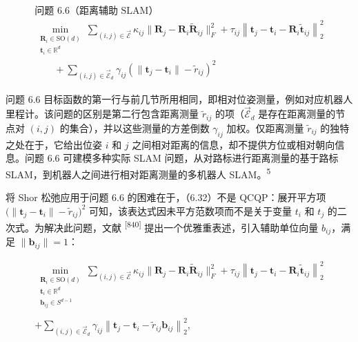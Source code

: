 \begin{equation}
\begin{array}{l} \text {问题 6.6（距离辅助 SLAM）} \\ \min_ {\substack {\boldsymbol {R} _ {i} \in \mathrm{SO} (d) \\ \boldsymbol {t} _ {i} \in \mathbb {R} ^ {d}}} \sum_ {(i, j) \in \overrightarrow {\mathcal {E}}} \kappa_ {i j} \| \boldsymbol {R} _ {j} - \boldsymbol {R} _ {i} \tilde {\boldsymbol {R}} _ {i j} \| _ {F} ^ {2} + \tau_ {i j} \left\| \boldsymbol {t} _ {j} - \boldsymbol {t} _ {i} - \boldsymbol {R} _ {i} \tilde {\boldsymbol {t}} _ {i j} \right\| _ {2} ^ {2} \\ \qquad + \sum_ {(i, j) \in \overrightarrow {\mathcal {E}} _ {d}} \gamma_ {i j} \left(\| \boldsymbol {t} _ {j} - \boldsymbol {t} _ {i} \| - \tilde {r} _ {i j}\right) ^ {2} \end{array}\tag{6.32}
\end{equation}

问题 6.6 目标函数的第一行与前几节所用相同，即相对位姿测量，例如对应机器人里程计。该问题的区别是第二行包含距离测量 $\tilde { r } _ { i j }$ 的项（$\overrightarrow { \mathcal { E } } _ { d }$ 是存在距离测量的节点对 $( i , j )$ 的集合），并以这些测量的方差倒数 $\gamma _ { i j }$ 加权。仅距离测量 $\tilde { r } _ { i j }$ 的独特之处在于，它给出位姿 $i$ 和 $j$ 之间相对距离的信息，却不提供方位或相对朝向信息。问题 6.6 可建模多种实际 SLAM 问题，从对路标进行距离测量的基于路标 SLAM，到机器人之间进行相对距离测量的多机器人 SLAM。\textsuperscript{5}

将 Shor 松弛应用于问题 6.6 的困难在于，（6.32）不是 QCQP：展开平方项 $\big ( \| \pmb { t } _ { j } - \pmb { t } _ { i } \| - \widetilde { r } _ { i j } \big ) ^ { 2}$ 可知，该表达式因未平方范数项而不是关于变量 $t_i$ 和 $t_j$ 的二次式。为解决此问题，文献 \textsuperscript{[840]} 提出一个优雅重表述，引入辅助单位向量 $b _ { i j }$，满足 $\| \pmb { b } _ { i j } \| = 1$：

\begin{equation}
\begin{array}{c}\min_{\substack{\boldsymbol{R}_{i}\in \mathrm{SO}(d)\\ \boldsymbol{t}_{i}\in \mathbb{R}^{d}\\ \boldsymbol{b}_{ij}\in S^{d - 1}}}\sum_{(i,j)\in \overrightarrow{\mathcal{E}}}\kappa_{ij}\| \boldsymbol{R}_{j} - \boldsymbol{R}_{i}\tilde{\boldsymbol{R}}_{ij}\|_{F}^{2} + \tau_{ij}\left\| \boldsymbol{t}_{j} - \boldsymbol{t}_{i} - \boldsymbol{R}_{i}\tilde{\boldsymbol{t}}_{ij}\right\|_{2}^{2}\\ \\ +\sum_{(i,j)\in \overrightarrow{\mathcal{E}}_{d}}\gamma_{ij}\left\| \boldsymbol{t}_{j} - \boldsymbol{t}_{i} - \tilde{r}_{ij}\boldsymbol{b}_{ij}\right\|_{2}^{2}, \end{array}\tag{6.33}
\end{equation}

